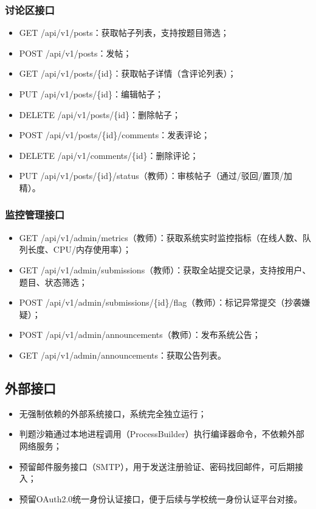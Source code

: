\documentclass{../template/softeng}
\begin{document}
\subsubsection{讨论区接口}
\begin{itemize}
	\item GET /api/v1/posts：获取帖子列表，支持按题目筛选；
	\item POST /api/v1/posts：发帖；
	\item GET /api/v1/posts/\{id\}：获取帖子详情（含评论列表）；
	\item PUT /api/v1/posts/\{id\}：编辑帖子；
	\item DELETE /api/v1/posts/\{id\}：删除帖子；
	\item POST /api/v1/posts/\{id\}/comments：发表评论；
	\item DELETE /api/v1/comments/\{id\}：删除评论；
	\item PUT /api/v1/posts/\{id\}/status（教师）：审核帖子（通过/驳回/置顶/加精）。
\end{itemize}

\subsubsection{监控管理接口}
\begin{itemize}
	\item GET /api/v1/admin/metrics（教师）：获取系统实时监控指标（在线人数、队列长度、CPU/内存使用率）；
	\item GET /api/v1/admin/submissions（教师）：获取全站提交记录，支持按用户、题目、状态筛选；
	\item POST /api/v1/admin/submissions/\{id\}/flag（教师）：标记异常提交（抄袭嫌疑）；
	\item POST /api/v1/admin/announcements（教师）：发布系统公告；
	\item GET /api/v1/admin/announcements：获取公告列表。
\end{itemize}

\subsection{外部接口}
\begin{itemize}
	\item 无强制依赖的外部系统接口，系统完全独立运行；
	\item 判题沙箱通过本地进程调用（ProcessBuilder）执行编译器命令，不依赖外部网络服务；
	\item 预留邮件服务接口（SMTP），用于发送注册验证、密码找回邮件，可后期接入；
	\item 预留OAuth2.0统一身份认证接口，便于后续与学校统一身份认证平台对接。
\end{itemize}
\end{document}

